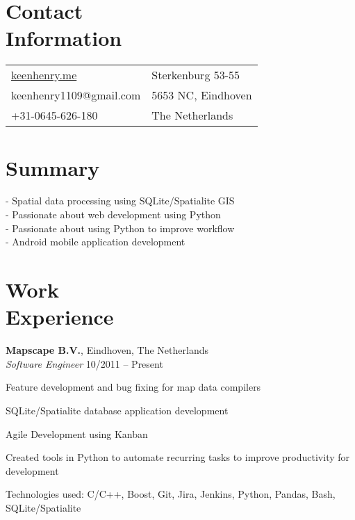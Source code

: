 \documentclass[margin,line]{resume}
\begin{document}
\begin{resume}

    \section{\myheadingstyle Contact \\ Information}
      \begin{tabular}{@{}p{7cm}p{6cm}}
      \url{keenhenry.me}      & Sterkenburg 53-55 \\
      keenhenry1109@gmail.com & 5653 NC, Eindhoven \\
      +31-0645-626-180        & The Netherlands \\
      \end{tabular}
 
    \section{\myheadingstyle Summary}
      - Spatial data processing using SQLite/Spatialite GIS \\
      - Passionate about web development using Python \\
      - Passionate about using Python to improve workflow \\
      - Android mobile application development \\
    \vspace{-5mm}

    \section{\myheadingstyle Work \\ Experience}

    \textbf{Mapscape B.V.}, Eindhoven, The Netherlands \\
    \textsl{Software Engineer} \hfill 10/2011 -- Present \vspace{-3mm}\\\vspace{-1mm}%
      \begin{list2}
      \item Feature development and bug fixing for map data compilers
      \item SQLite/Spatialite database application development
      \item Agile Development using Kanban
      \item Created tools in Python to automate recurring tasks to improve productivity for development
      \item Technologies used: C/C++, Boost, Git, Jira, Jenkins, Python, Pandas, Bash, SQLite/Spatialite
      \end{list2}


\end{resume}
\end{document}
